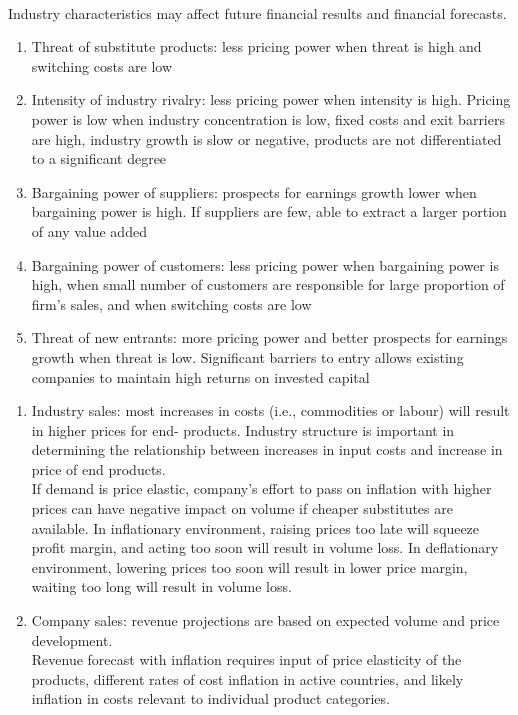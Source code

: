 \begin{remark} \\
Industry characteristics may affect future financial results and financial forecasts.
\begin{enumerate}[label=\roman*.]
\setlength{\itemsep}{0pt}
\item Threat of substitute products: less pricing power when threat is high and switching costs are low
\item Intensity of industry rivalry: less pricing power when intensity is high. Pricing power is low when industry concentration is low, fixed costs and exit barriers are high, industry growth is slow or negative, products are not differentiated to a significant degree
\item Bargaining power of suppliers: prospects for earnings growth lower when bargaining power is high. If suppliers are few, able to extract a larger portion of any value added
\item Bargaining power of customers: less pricing power when bargaining power is high, when small number of customers are responsible for large proportion of firm's sales, and when switching costs are low
\item Threat of new entrants: more pricing power and better prospects for earnings growth when threat is low. Significant barriers to entry allows existing companies to maintain high returns on invested capital
\end{enumerate}
\end{remark}

\begin{remark} 
\begin{enumerate}[label=\roman*.]
\setlength{\itemsep}{0pt}
\item Industry sales: most increases in costs (i.e., commodities or labour) will result in higher prices for end- products. Industry structure is important in determining the relationship between increases in input costs and increase in price of end products.\\
If demand is price elastic, company's effort to pass on inflation with higher prices can have negative impact on volume if cheaper substitutes are available. In inflationary environment, raising prices too late will squeeze profit margin, and acting too soon will result in volume loss. In deflationary environment, lowering prices too soon will result in lower price margin, waiting too long will result in volume loss.
\item Company sales: revenue projections are based on expected volume and price development.\\
Revenue forecast with inflation requires input of price elasticity of the products, different rates of cost inflation in active countries, and likely inflation in costs relevant to individual product categories.
\end{enumerate}
\end{remark}


